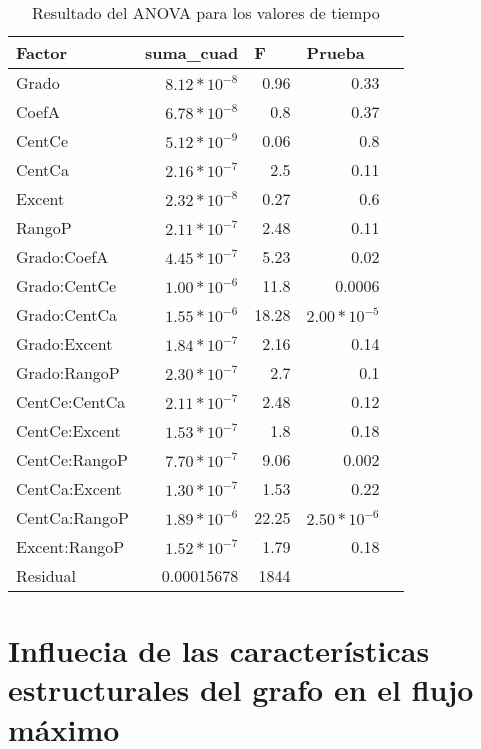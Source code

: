 \documentclass{article}
\begin{document}
\begin{table}
  \centering
  \caption{Resultado del ANOVA para los valores de tiempo}
    \begin{tabular}{|l|r|r|r|r|}
    \toprule
    \rowcolor[rgb]{ .357,  .608,  .835} \textbf{Factor} & \multicolumn{1}{l|}{\textbf{suma\_cuad}} & \multicolumn{1}{l|}{\textbf{F}} & \multicolumn{1}{l|}{\textbf{Prueba}} \\
    \midrule
    Grado & $8.12*10^{-8}$      & 0.96  & 0.33 \\
    \midrule
    CoefA & $6.78*10^{-8} $     & 0.8   & 0.37 \\
    \midrule
    CentCe & $5.12*10^{-9}$     & 0.06  & 0.8 \\
    \midrule
    CentCa & $2.16*10^{-7} $    & 2.5   & 0.11 \\
    \midrule
    Excent & $2.32*10^{-8} $     & 0.27  & 0.6 \\
    \midrule
    RangoP & $2.11*10^{-7} $     & 2.48  & 0.11 \\
    \midrule
    Grado:CoefA & $4.45*10^{-7} $     & 5.23  & 0.02 \\
    \midrule
    Grado:CentCe & $1.00*10^{-6}$     & 11.8  & 0.0006 \\
    \midrule
    Grado:CentCa & $1.55*10^{-6} $  & 18.28 & $2.00*10^{-
    5}$ \\
    \midrule
    Grado:Excent & $1.84*10^{-7}$   & 2.16  & 0.14 \\
    \midrule
    Grado:RangoP & $2.30*10^{-7}$ & 2.7   & 0.1 \\
    \midrule
    CentCe:CentCa & $2.11*10^{-7} $ & 2.48  & 0.12 \\
    \midrule
    CentCe:Excent & $1.53*10^{-7}$   & 1.8   & 0.18 \\
    \midrule
    CentCe:RangoP & $7.70*10^{-7} $ & 9.06  & 0.002 \\
    \midrule
    CentCa:Excent & $1.30*10^{-7} $ & 1.53  & 0.22 \\
    \midrule
    CentCa:RangoP &$ 1.89*10^{-6} $& 22.25 & $2.50*10^{-6} $\\
    \midrule
    Excent:RangoP & $1.52*10^{-7}$  & 1.79  & 0.18 \\
    \midrule
    Residual & 0.00015678 & 1844 &  \\
    \bottomrule
    \end{tabular}%
  \label{tab:Cuadro 1}%
\end{table}%

\section*{Influecia de las características estructurales del grafo en el flujo máximo}
\end{document}
